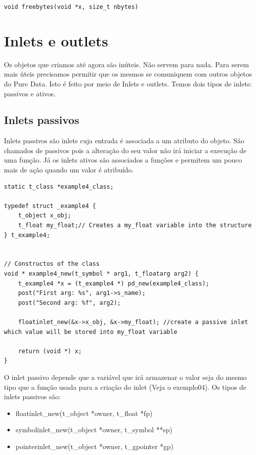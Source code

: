 \documentclass[10pt,a4paper]{report}
\begin{document}
\begin{lstlisting}
void freebytes(void *x, size_t nbytes)
\end{lstlisting}


\chapter{Inlets e outlets}
Os objetos que criamos até agora são inúteis. Não servem para nada. Para serem mais úteis precisamos permitir que os mesmos se comuniquem com outros objetos do Pure Data. Isto é feito por meio de Inlets e outlets. Temos dois tipos de inlets: passivos e ativos. 

\section{Inlets passivos}
Inlets passivos são inlets cuja entrada é associada a um atributo do objeto. São chamados de passivos pois a alteração do seu valor não irá iniciar a execução de uma função. Já os inlets ativos são associados a funções e permitem um pouco mais de ação quando um valor é atribuído.

\begin{lstlisting}
static t_class *example4_class;

typedef struct _example4 {
    t_object x_obj;
    t_float my_float;// Creates a my_float variable into the structure
} t_example4;


// Constructos of the class
void * example4_new(t_symbol * arg1, t_floatarg arg2) {
    t_example4 *x = (t_example4 *) pd_new(example4_class);
    post("First arg: %s", arg1->s_name);
    post("Second arg: %f", arg2);

    floatinlet_new(&x->x_obj, &x->my_float); //create a passive inlet which value will be stored into my_float variable

    return (void *) x;
}
\end{lstlisting}

O inlet passivo depende que a variável que irá armazenar o valor seja do mesmo tipo que a função usada para a criação do inlet (Veja o exemplo04). Os tipos de inlets passivos são:

\begin{itemize}
\item floatinlet\_new(t\_object *owner, t\_float *fp)
\item symbolinlet\_new(t\_object *owner, t\_symbol **sp)
\item pointerinlet\_new(t\_object *owner, t\_gpointer *gp)
\end{itemize}
\end{document}
